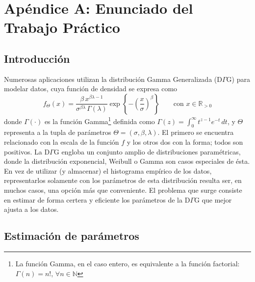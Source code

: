 \documentclass[a4paper,10pt,twoside]{article}
\begin{document}
\blindtext




\section{Apéndice A: Enunciado del Trabajo Práctico}

\newcommand{\real}{\mathbb{R}}
\newcommand{\nat}{\mathbb{N}}
\newcommand{\eme}{\mathcal{M}}
\newcommand{\emeh}{\widehat{\mathcal{M}}}
\newcommand{\ere}{\mathcal{R}}

\subsection{Introducci\'on}

Numerosas aplicaciones utilizan la distribuci\'on Gamma Generalizada (D$\Gamma$G) para modelar datos, cuya funci\'on de densidad se expresa como $$f_\Theta(x)=\frac{\beta\, x^{\beta \lambda - 1}}{\sigma^{\beta \lambda}\, \Gamma(\lambda)} \exp\left\{-\left(\frac{x}{\sigma} \right)^\beta \right\}\qquad\textrm{con } x\in\real_{>0}$$ donde 
$\Gamma(\cdot)$ es la funci\'on Gamma\footnote{La funci\'on Gamma, en el caso entero, es equivalente a la funci\'on factorial: $\Gamma(n)=n!$, $\forall n\in\nat$ } definida como $\Gamma(z)=\int_0^{\infty}{t^{z-1}e^{-t}\,dt}$, y $\Theta$ representa a la tupla de par\'ametros $\Theta=(\sigma,\beta,\lambda)$. El primero se encuentra relacionado con la escala de la funci\'on $f$ y los otros dos con la forma; todos son positivos.
La D$\Gamma$G engloba un conjunto amplio de distribuciones param\'etricas, donde la distribuci\'on exponencial, Weibull o Gamma son casos especiales de \'esta.
En vez de utilizar (y almacenar) el histograma emp\'irico de los datos, representarlos solamente con los par\'ametros de esta distribuci\'on resulta ser, en muchos casos, una opci\'on m\'as que conveniente. El problema que surge consiste en estimar de forma certera y eficiente los par\'ametros de la D$\Gamma$G que mejor ajusta a los datos.

\subsection{Estimaci\'on de par\'ametros}
\end{document}
